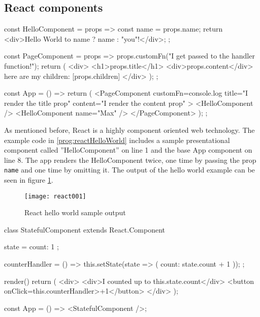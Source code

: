 \subsection{React components}
\label{sec:reactComponents}

\begin{program}
\caption{Simple example of a React component and its usage} 
\label{prog:reactHelloWorld}
\begin{JsCode}
const HelloComponent = props => {
  const name = props.name;
  return <div>Hello World to {name ? name : "you"}!</div>;
};

const PageComponent = props => {
  props.customFn("I get passed to the handler function!");
  return (
    <div>
      <h1>{props.title}</h1>
      <div>{props.content}</div>
      here are my children: [{props.children}]
    </div>
  );
};

const App = () => {
  return (
    <PageComponent
      customFn={console.log}
      title="I render the title prop"
      content="I render the content prop"
    >
      <HelloComponent />
      <HelloComponent name={"Max"} />
    </PageComponent>
  );
};
\end{JsCode}
\end{program}

As mentioned before, React is a highly component oriented web technology. The example code in \ref{prog:reactHelloWorld} includes a sample presentational component called ''HelloComponent'' on line 1 and the base App component on line 8. The app renders the HelloComponent twice, one time by passing the prop \texttt{name} and one time by omitting it. The output of the hello world example can be seen in figure \ref{fig:reactHelloWorld}.

\begin{figure}
  \centering
  \texttt{[image: react001]}
  \caption{React hello world sample output}
  \label{fig:reactHelloWorld}
\end{figure}

\begin{program}
\caption{Simple example of a React component and its usage} 
\label{prog:reactStatefulComponent}
\begin{JsCode}
class StatefulComponent extends React.Component {
  state = {
    count: 1
  };

  counterHandler = () => {
    this.setState(state => ({ count: state.count + 1 }));
  };

  render() {
    return (
      <div>
        <div>I counted up to {this.state.count}</div>
        <button onClick={this.counterHandler}>+1</button>
      </div>
    );
  }
}

const App = () => <StatefulComponent />;
\end{JsCode}
\end{program}

